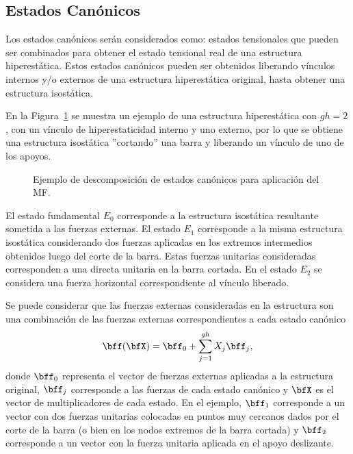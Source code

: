 \subsection{Estados Canónicos}

Los estados canónicos serán considerados como: estados tensionales que pueden ser combinados para obtener el estado tensional real de una estructura hiperestática. %
%
Estos estados canónicos pueden ser obtenidos liberando vínculos internos y/o externos de una estructura hiperestática original, hasta obtener una estructura isostática.

En la Figura~\ref{fig:estadoscanon} se muestra un ejemplo de una estructura hiperestática con $gh=2$, con un vínculo de hiperestaticidad interno y uno externo, por lo que se obtiene una estructura isostática ''cortando'' una barra y liberando un vínculo de uno de los apoyos. %


\begin{figure}[htb]
	\centering
	\def\svgwidth{0.95\textwidth}

	\caption{Ejemplo de descomposición de estados canónicos para aplicación del MF.}
	\label{fig:estadoscanon}
\end{figure}

El estado fundamental $E_0$ corresponde a la estructura isostática resultante sometida a las fuerzas externas. %
%
El estado $E_1$ corresponde a la misma estructura isostática considerando dos fuerzas aplicadas en los extremos intermedios obtenidos luego del corte de la barra. Estas fuerzas unitarias consideradas corresponden a una directa unitaria en la barra cortada. %
%
En el estado $E_2$ se considera una fuerza horizontal correspondiente al vínculo liberado.
%



Se puede considerar que las fuerzas externas consideradas en la estructura son una combinación de las fuerzas externas correspondientes a cada estado canónico
%
\begin{equation}\label{eqn:fueX}
\bff(\bfX) = \bff_0 + \sum_{j=1}^{gh} X_j \bff_j,
\end{equation}
donde  $\bff_0$ representa el vector de fuerzas externas aplicadas a la estructura original, $\bff_j$ corresponde a las fuerzas de cada estado canónico y $\bfX$ es el vector de multiplicadores de cada estado.
%
En el ejemplo, $\bff_1$ corresponde a un vector con dos fuerzas unitarias colocadas en puntos muy cercanos dados por el corte de la barra (o bien en los nodos extremos de la barra cortada) y $\bff_2$ corresponde a un vector con la fuerza unitaria aplicada en el apoyo deslizante.

